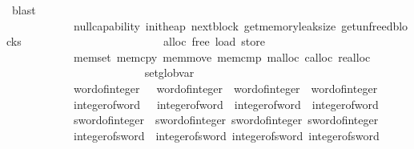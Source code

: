\begin{isabellebody}
\ blast\isanewline
{}\isamarkupfalse%
%
\endisatagproof
{\isafoldproof}%
%
\isadelimproof
\isanewline
%
\endisadelimproof
\isanewline
{}\isamarkupfalse%
\ \isanewline
\ \ \ \ \ \ \ \ \ \ \ \ null{\isacharunderscore}{\kern0pt}capability\ init{\isacharunderscore}{\kern0pt}heap\ next{\isacharunderscore}{\kern0pt}block\ get{\isacharunderscore}{\kern0pt}memory{\isacharunderscore}{\kern0pt}leak{\isacharunderscore}{\kern0pt}size\ get{\isacharunderscore}{\kern0pt}unfreed{\isacharunderscore}{\kern0pt}blocks\isanewline
\ \ \ \ \ \ \ \ \ \ \ \ \isanewline
\ \ \ \ \ \ \ \ \ \ \ \ alloc\ free\ load\ store\isanewline
\ \ \ \ \ \ \ \ \ \ \ \ memset\ memcpy\ memmove\ memcmp\ malloc\ calloc\ realloc\isanewline
\ \ \ \ \ \ \ \ \ \ \ \ \isanewline
\ \ \ \ \ \ \ \ \ \ \ \ set{\isacharunderscore}{\kern0pt}glob{\isacharunderscore}{\kern0pt}var\isanewline
\ \ \ \ \ \ \ \ \ \ \ \ \ \ \ \ \ \ \ \ \isanewline
\ \ \ \ \ \ \ \ \ \ \ \ word{}{\isacharunderscore}{\kern0pt}of{\isacharunderscore}{\kern0pt}integer\ \ \ word{}{}{\isacharunderscore}{\kern0pt}of{\isacharunderscore}{\kern0pt}integer\ \ word{}{}{\isacharunderscore}{\kern0pt}of{\isacharunderscore}{\kern0pt}integer\ \ word{}{}{\isacharunderscore}{\kern0pt}of{\isacharunderscore}{\kern0pt}integer\isanewline
\ \ \ \ \ \ \ \ \ \ \ \ integer{\isacharunderscore}{\kern0pt}of{\isacharunderscore}{\kern0pt}word{}\ \ \ integer{\isacharunderscore}{\kern0pt}of{\isacharunderscore}{\kern0pt}word{}{}\ \ integer{\isacharunderscore}{\kern0pt}of{\isacharunderscore}{\kern0pt}word{}{}\ \ integer{\isacharunderscore}{\kern0pt}of{\isacharunderscore}{\kern0pt}word{}{}\isanewline
\ \ \ \ \ \ \ \ \ \ \ \ sword{}{\isacharunderscore}{\kern0pt}of{\isacharunderscore}{\kern0pt}integer\ \ sword{}{}{\isacharunderscore}{\kern0pt}of{\isacharunderscore}{\kern0pt}integer\ sword{}{}{\isacharunderscore}{\kern0pt}of{\isacharunderscore}{\kern0pt}integer\ sword{}{}{\isacharunderscore}{\kern0pt}of{\isacharunderscore}{\kern0pt}integer\isanewline
\ \ \ \ \ \ \ \ \ \ \ \ integer{\isacharunderscore}{\kern0pt}of{\isacharunderscore}{\kern0pt}sword{}\ \ integer{\isacharunderscore}{\kern0pt}of{\isacharunderscore}{\kern0pt}sword{}{}\ integer{\isacharunderscore}{\kern0pt}of{\isacharunderscore}{\kern0pt}sword{}{}\ integer{\isacharunderscore}{\kern0pt}of{\isacharunderscore}{\kern0pt}sword{}{}\isanewline

\end{isabellebody}
